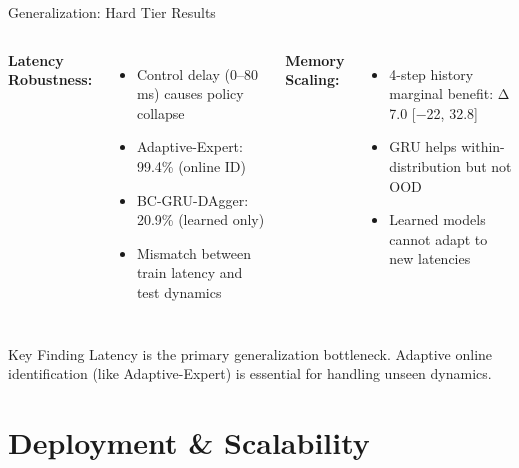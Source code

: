 \documentclass[10pt,aspectratio=16:9]{beamer}
\begin{document}
\begin{frame}{Generalization: Hard Tier Results}
  \vspace{-0.5em}
  \begin{columns}
    \textbf{Latency Robustness:}
    \begin{itemize}
      \item Control delay (0–80 ms) causes policy collapse
      \item Adaptive-Expert: 99.4\% (online ID)
      \item BC-GRU-DAgger: 20.9\% (learned only)
      \item Mismatch between train latency and test dynamics
    \end{itemize}

    \textbf{Memory Scaling:}
    \begin{itemize}
      \item 4-step history marginal benefit: Δ 7.0 [−22, 32.8]
      \item GRU helps within-distribution but not OOD
      \item Learned models cannot adapt to new latencies
    \end{itemize}
  \end{columns}

  \vspace{1em}

  \begin{alertblock}{Key Finding}
    Latency is the primary generalization bottleneck. Adaptive online identification (like
    Adaptive-Expert) is essential for handling unseen dynamics.
  \end{alertblock}
\end{frame}

\section{Deployment \& Scalability}
\end{document}
